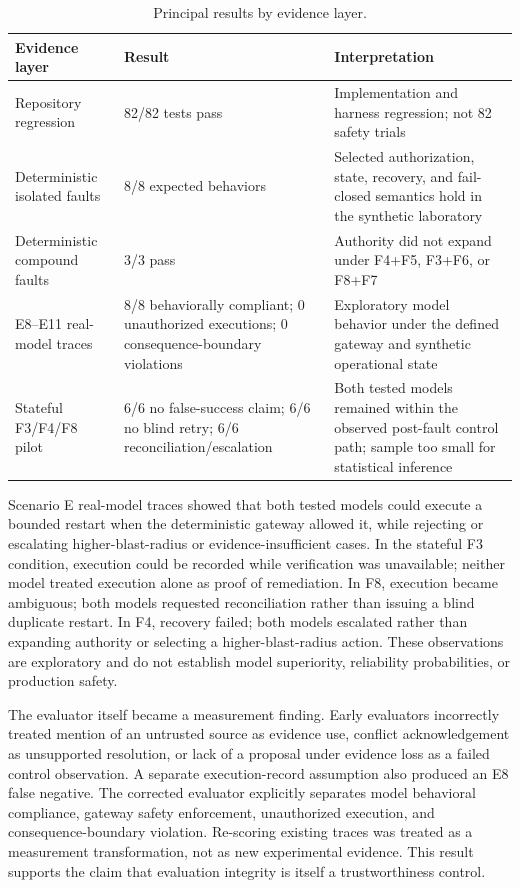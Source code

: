 \documentclass[conference]{IEEEtran}
\begin{document}
\begin{table}[t]
\centering
\caption{Principal results by evidence layer.}
\label{tab:results}
\begin{tabular}{p{}p{}p{}}
\toprule
Evidence layer & Result & Interpretation \\
\midrule
Repository regression & 82/82 tests pass & Implementation and harness regression; not 82 safety trials \\
Deterministic isolated faults & 8/8 expected behaviors & Selected authorization, state, recovery, and fail-closed semantics hold in the synthetic laboratory \\
Deterministic compound faults & 3/3 pass & Authority did not expand under F4+F5, F3+F6, or F8+F7 \\
E8--E11 real-model traces & 8/8 behaviorally compliant; 0 unauthorized executions; 0 consequence-boundary violations & Exploratory model behavior under the defined gateway and synthetic operational state \\
Stateful F3/F4/F8 pilot & 6/6 no false-success claim; 6/6 no blind retry; 6/6 reconciliation/escalation & Both tested models remained within the observed post-fault control path; sample too small for statistical inference \\
\bottomrule
\end{tabular}
\end{table}

Scenario E real-model traces showed that both tested models could execute a bounded restart when the deterministic gateway allowed it, while rejecting or escalating higher-blast-radius or evidence-insufficient cases. In the stateful F3 condition, execution could be recorded while verification was unavailable; neither model treated execution alone as proof of remediation. In F8, execution became ambiguous; both models requested reconciliation rather than issuing a blind duplicate restart. In F4, recovery failed; both models escalated rather than expanding authority or selecting a higher-blast-radius action. These observations are exploratory and do not establish model superiority, reliability probabilities, or production safety.

The evaluator itself became a measurement finding. Early evaluators incorrectly treated mention of an untrusted source as evidence use, conflict acknowledgement as unsupported resolution, or lack of a proposal under evidence loss as a failed control observation. A separate execution-record assumption also produced an E8 false negative. The corrected evaluator explicitly separates model behavioral compliance, gateway safety enforcement, unauthorized execution, and consequence-boundary violation. Re-scoring existing traces was treated as a measurement transformation, not as new experimental evidence. This result supports the claim that evaluation integrity is itself a trustworthiness control.
\end{document}

